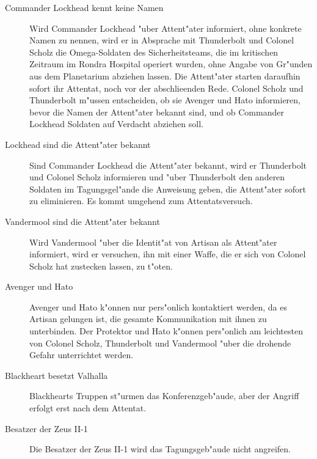 \begin{description}
	\item[Commander Lockhead kennt keine Namen] Wird Commander Lockhead "uber Attent"ater informiert, ohne konkrete Namen zu nennen, wird er 	
		in Absprache mit Thunderbolt und Colonel Scholz die Omega-Soldaten des Sicherheitsteams, die im kritischen Zeitraum im Rondra Hospital operiert wurden, ohne Angabe von Gr"unden aus dem Planetarium abziehen lassen. Die Attent"ater starten daraufhin sofort ihr Attentat, noch vor der abschlie\3enden Rede. Colonel Scholz und Thunderbolt m"ussen entscheiden, ob sie Avenger und Hato informieren, bevor die Namen der Attent"ater bekannt sind, und ob Commander Lockhead Soldaten auf Verdacht abziehen soll.
	\item[Lockhead sind die Attent"ater bekannt] Sind Commander Lockhead die Attent"ater bekannt, wird er Thunderbolt und Colonel Scholz 
		informieren und "uber Thunderbolt den anderen Soldaten im Tagungsgel"ande die Anweisung geben, die Attent"ater sofort zu eliminieren. Es kommt umgehend zum Attentatsversuch.
	\item[Vandermool sind die Attent"ater bekannt] Wird Vandermool "uber die Identit"at von Artisan als Attent"ater informiert, wird er 
		versuchen, ihn mit einer Waffe, die er sich von Colonel Scholz hat zustecken lassen, zu t"oten.
	\item[Avenger und Hato] Avenger und Hato k"onnen nur pers"onlich kontaktiert werden, da es Artisan gelungen ist, die gesamte 
		Kommunikation mit ihnen zu unterbinden. Der Protektor und Hato k"onnen pers"onlich am leichtesten von Colonel Scholz, Thunderbolt und Vandermool "uber die drohende Gefahr unterrichtet werden.
	\item[Blackheart besetzt Valhalla] Blackhearts Truppen st"urmen das Konferenzgeb"aude, aber der Angriff erfolgt erst nach dem Attentat.
	\item[Besatzer der Zeus II-1] Die Besatzer der Zeus II-1 wird das Tagungsgeb"aude nicht angreifen.
\end{description}


